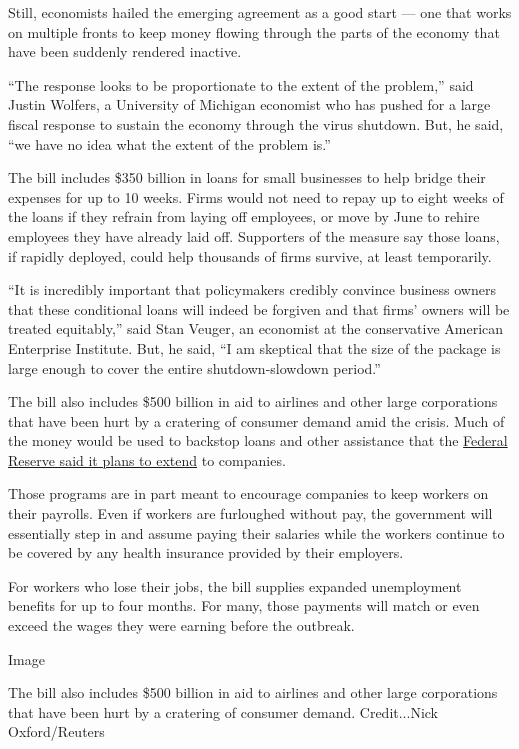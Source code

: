 Still, economists hailed the emerging agreement as a good start --- one
that works on multiple fronts to keep money flowing through the parts of
the economy that have been suddenly rendered inactive.

``The response looks to be proportionate to the extent of the problem,''
said Justin Wolfers, a University of Michigan economist who has pushed
for a large fiscal response to sustain the economy through the virus
shutdown. But, he said, ``we have no idea what the extent of the problem
is.''

The bill includes \$350 billion in loans for small businesses to help
bridge their expenses for up to 10 weeks. Firms would not need to repay
up to eight weeks of the loans if they refrain from laying off
employees, or move by June to rehire employees they have already laid
off. Supporters of the measure say those loans, if rapidly deployed,
could help thousands of firms survive, at least temporarily.

``It is incredibly important that policymakers credibly convince
business owners that these conditional loans will indeed be forgiven and
that firms' owners will be treated equitably,'' said Stan Veuger, an
economist at the conservative American Enterprise Institute. But, he
said, ``I am skeptical that the size of the package is large enough to
cover the entire shutdown-slowdown period.''

The bill also includes \$500 billion in aid to airlines and other large
corporations that have been hurt by a cratering of consumer demand amid
the crisis. Much of the money would be used to backstop loans and other
assistance that the
\href{https://www.nytimes.com/2020/03/23/business/economy/coronavirus-fed-bond-buying.html}{Federal
Reserve said it plans to extend} to companies.

Those programs are in part meant to encourage companies to keep workers
on their payrolls. Even if workers are furloughed without pay, the
government will essentially step in and assume paying their salaries
while the workers continue to be covered by any health insurance
provided by their employers.

For workers who lose their jobs, the bill supplies expanded unemployment
benefits for up to four months. For many, those payments will match or
even exceed the wages they were earning before the outbreak.

Image

The bill also includes \$500 billion in aid to airlines and other large
corporations that have been hurt by a cratering of consumer demand.
Credit...Nick Oxford/Reuters

